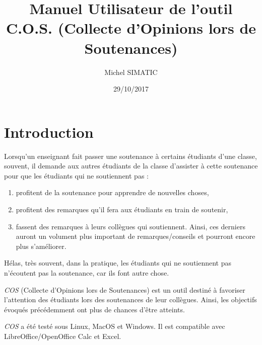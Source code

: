 \documentclass[11pt]{article}
\author{Michel SIMATIC}
\date{29/10/2017}
\title{Manuel Utilisateur de l'outil C.O.S. (Collecte d'Opinions lors de Soutenances)}
\begin{document}
\maketitle
\tableofcontents


\section{Introduction}
\label{sec-1}
Lorsqu'un enseignant fait passer une soutenance à certains étudiants
d'une classe, souvent, il demande aux autres étudiants de la classe
d'assister à cette soutenance pour que les étudiants qui ne
soutiennent pas :
\begin{enumerate}
\item profitent de la soutenance pour apprendre de nouvelles choses,
\item profitent des remarques qu'il fera aux étudiants en train de
soutenir,
\item fassent des remarques à leurs collègues qui soutiennent. Ainsi, ces
derniers auront un volument plus important de remarques/conseils et
pourront encore plus s'améliorer.
\end{enumerate}
Hélas, très souvent, dans la pratique, les étudiants qui ne soutiennent
pas n'écoutent pas la soutenance, car ils font autre chose.

\emph{COS} (Collecte d'Opinions lors de Soutenances) est un outil destiné
à favoriser l'attention des étudiants lors des soutenances de leur
collègues. Ainsi, les objectifs évoqués précédemment ont plus de
chances d'être atteints.

\emph{COS} a été testé sous Linux, MacOS et Windows. Il est compatible avec
LibreOffice/OpenOffice Calc et Excel.
\end{document}
